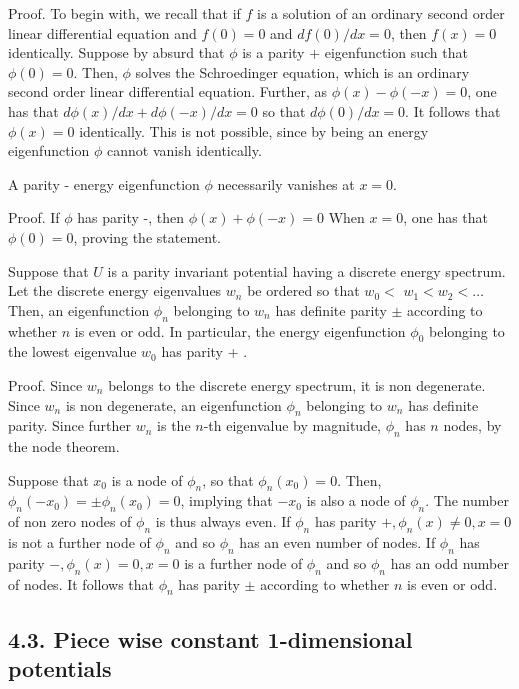 \documentclass{article}
\begin{document}
Proof. To begin with, we recall that if $f$ is a solution of an ordinary second order linear differential equation and $f(0)=0$ and $d f(0) / d x=0$, then $f(x)=0$ identically. Suppose by absurd that $\phi$ is a parity + eigenfunction such that $\phi(0)=0$. Then, $\phi$ solves the Schroedinger equation, which is an ordinary second order linear differential equation. Further, as $\phi(x)-\phi(-x)=0$, one has that $d \phi(x) / d x+d \phi(-x) / d x=0$ so
that $d \phi(0) / d x=0$. It follows that $\phi(x)=0$ identically. This is not possible, since by being an energy eigenfunction $\phi$ cannot vanish identically.

A parity - energy eigenfunction $\phi$ necessarily vanishes at $x=0$.

Proof. If $\phi$ has parity -, then $\phi(x)+\phi(-x)=0$ When $x=0$, one has that $\phi(0)=0$, proving the statement.

Suppose that $U$ is a parity invariant potential having a discrete energy spectrum. Let the discrete energy eigenvalues $w_{n}$ be ordered so that $w_{0}<$ $w_{1}<w_{2}<\ldots$ Then, an eigenfunction $\phi_{n}$ belonging to $w_{n}$ has definite parity $\pm$ according to whether $n$ is even or odd. In particular, the energy eigenfunction $\phi_{0}$ belonging to the lowest eigenvalue $w_{0}$ has parity + .

Proof. Since $w_{n}$ belongs to the discrete energy spectrum, it is non degenerate. Since $w_{n}$ is non degenerate, an eigenfunction $\phi_{n}$ belonging to $w_{n}$ has definite parity. Since further $w_{n}$ is the $n$-th eigenvalue by magnitude, $\phi_{n}$ has $n$ nodes, by the node theorem.

Suppose that $x_{0}$ is a node of $\phi_{n}$, so that $\phi_{n}\left(x_{0}\right)=0$. Then, $\phi_{n}\left(-x_{0}\right)= \pm \phi_{n}\left(x_{0}\right)=0$, implying that $-x_{0}$ is also a node of $\phi_{n}$. The number of non zero nodes of $\phi_{n}$ is thus always even. If $\phi_{n}$ has parity $+, \phi_{n}(x) \neq 0, x=0$ is not a further node of $\phi_{n}$ and so $\phi_{n}$ has an even number of nodes. If $\phi_{n}$ has parity $-, \phi_{n}(x)=0, x=0$ is a further node of $\phi_{n}$ and so $\phi_{n}$ has an odd number of nodes. It follows that $\phi_{n}$ has parity $\pm$ according to whether $n$ is even or odd.

\subsection*{4.3. Piece wise constant 1-dimensional potentials}
\end{document}

